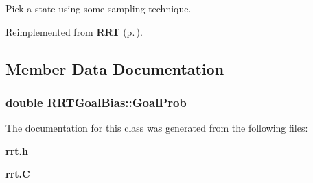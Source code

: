 Pick a state using some sampling technique.



Reimplemented from {\bf RRT} {\rm (p.\,\pageref{classRRT_b4})}.

\subsection{Member Data Documentation}
\subsubsection{\setlength{\rightskip}{0pt plus 5cm}double RRTGoal\-Bias::Goal\-Prob}\label{classRRTGoalBias_m0}




The documentation for this class was generated from the following files:\begin{CompactItemize}
\item 
{\bf rrt.h}\item 
{\bf rrt.C}\end{CompactItemize}
